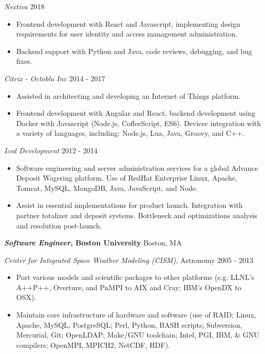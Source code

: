 \documentclass[line,margin]{res}
\begin{document}
\begin{resume}
          {\sl Nextiva} \hfill 2018
          \begin{itemize} \itemsep -2pt
          \item
            Frontend development with React and Javascript, implementing design requirements for user identity and 
            access management administration.
          \item
            Backend support with Python and Java, code reviews, debugging, and bug fixes.
          \end{itemize}

          {\sl Citrix - Octoblu Inc} \hfill 2014 - 2017
          \begin{itemize} \itemsep -2pt
          \item
            Assisted in architecting and developing an Internet of Things platform.
          \item
            Frontend development with Angular and React, backend development using Docker with Javascript (Node.js, CoffeeScript, ES6).
            Devicec integration with a variety of languages, including: Node.js, Lua, Java, Groovy, and C++.
          \end{itemize}

          {\sl Iced Development} \hfill 2012 - 2014
          \begin{itemize} \itemsep -2pt
          \item
            Software engineering and server administration services for a global Advance Deposit Wagering platform. Use of RedHat Enterprise Linux, Apache, Tomcat, MySQL, MongoDB, Java, JavaScript, and Node.
          \item
            Assist in essential implementations for product launch. Integration with partner totalizer and deposit systems. Bottleneck and optimizations analysis and resolution post-launch.
          \end{itemize}

          {\bf \emph{Software Engineer}, Boston University} \hfill Boston, MA

          {\sl Center for Integrated Space Weather Modeling (CISM)}, Astronomy \hfill 2005 - 2013
          \begin{itemize} \itemsep -2pt %
          \item
            Port various models and scientific packages to other platforms (e.g. LLNL's A++P++, Overture, and PnMPI to AIX and Cray; IBM's OpenDX to OSX).
          \item
            Maintain core infrastructure of hardware and software (use of RAID; Linux, Apache, MySQL, PostgreSQL; Perl, Python, BASH scripts; Subversion, Mercurial, Git; OpenLDAP; Make/GNU toolchain; Intel, PGI, IBM, \& GNU compilers; OpenMPI, MPICH2, NetCDF, HDF).
          \end{itemize}


\end{resume}
\end{document}
